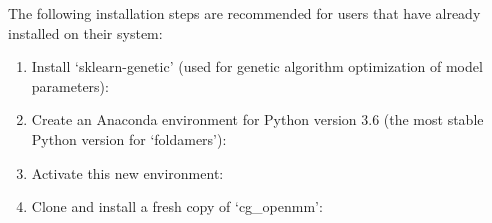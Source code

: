 \documentclass[letterpaper,12pt,english,openany,oneside]{sphinxmanual}
\begin{document}
The following installation steps are recommended for users that have already installed  on their system:
\begin{enumerate}
\def\theenumi{\arabic{enumi}}
\def\labelenumi{\theenumi )}
\makeatletter\def\p@enumii{\p@enumi \theenumi )}\makeatother
\item {} 
Install ‘sklearn-genetic’ (used for genetic algorithm optimization of model parameters):

\begin{sphinxVerbatim}[commandchars=\\\{\}]
  
\end{sphinxVerbatim}

\item {} 
Create an Anaconda environment for Python version 3.6 (the most stable Python version for ‘foldamers’):

\begin{sphinxVerbatim}[commandchars=\\\{\}]
          
\end{sphinxVerbatim}

\item {} 
Activate this new environment:

\begin{sphinxVerbatim}[commandchars=\\\{\}]
  
\end{sphinxVerbatim}

\item {} 
Clone and install a fresh copy of ‘cg\_openmm’:

\begin{sphinxVerbatim}[commandchars=\\\{\}]
  
 
  
\end{sphinxVerbatim}


\end{enumerate}
\end{document}

